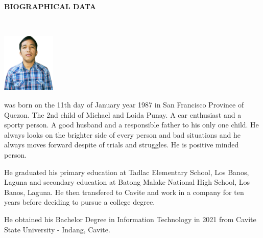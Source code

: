\begin{doublespace}
	\thispagestyle{empty}

	\begin{center}
		\textbf{BIOGRAPHICAL DATA}
	\end{center}
	\leavevmode\\

	\begin{center}
		\includegraphics[width=1in]{media/jaykel.jpg}
	\end{center}

	\justify
	\textbf{} was born on the 11th day of January year
	1987 in San Francisco Province of Quezon. The 2nd child of Michael and Loida
	Punay. A car enthusiast and a sporty person. A good husband and
	a responsible father to his only one child. He always looks on the brighter
	side of every person and bad situations and he always moves forward despite
	of trials and struggles. He is positive minded person.

	\parx
	He graduated his primary education at Tadlac Elementary School, Los Banos, Laguna
	and secondary education at Batong Malake National High School, Los Banos, Laguna.
	He then transfered to Cavite and work in a company for ten years before deciding
	to pursue a college degree.

	\parx
	He obtained his Bachelor Degree in Information Technology in 2021 from Cavite
	State University - Indang, Cavite.
\end{doublespace}
